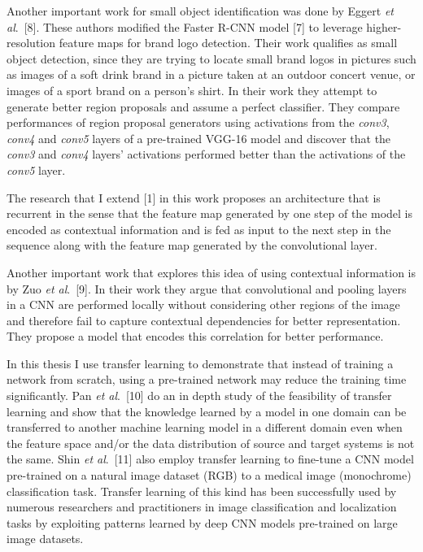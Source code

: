 \documentclass [11pt,letterpaper ,twoside ,openany ]{report}
\begin{document}
    Another important work for small object identification was done by Eggert \textit{et al}.\ [8]. These authors modified the Faster R-CNN model [7] to leverage higher-resolution feature maps for brand logo detection. Their work qualifies as small object detection, since they are trying to locate small brand logos in pictures such as images of a soft drink brand in a picture taken at an outdoor concert venue, or images of a sport brand on a person's shirt. In their work they attempt to generate better region proposals and assume a perfect classifier. They compare performances of region proposal generators using activations from the \textit{conv3}, \textit{conv4} and \textit{conv5} layers of a pre-trained VGG-16 model and discover that the \textit{conv3} and \textit{conv4} layers' activations performed better than the activations of the \textit{conv5} layer. 

    The research that I extend [1] in this work proposes an architecture that is recurrent in the sense that the feature map generated by one step of the model is encoded as contextual information and is fed as input to the next step in the sequence along with the feature map generated by the convolutional layer. 

    Another important work that explores this idea of using contextual information is by Zuo \textit{et al}.\ [9]. In their work they argue that convolutional and pooling layers in a CNN are performed locally without considering other regions of the image and therefore fail to capture contextual dependencies for better representation. They propose a model that encodes this correlation for better performance.

    In this thesis I use transfer learning to demonstrate that instead of training a network from scratch, using a pre-trained network may reduce  the training time significantly. Pan \textit{et al}.\ [10] do an in depth study of the feasibility of transfer learning and show that the knowledge learned by a model in one domain can be transferred to another machine learning model in a different domain even when the feature space and/or the data distribution of source and target systems is not the same. Shin \textit{et al}.\ [11] also employ transfer learning to fine-tune a CNN model pre-trained on a natural image dataset (RGB) to a medical image (monochrome) classification task. Transfer learning of this kind has been successfully used by numerous researchers and practitioners in image classification and localization tasks by exploiting patterns learned by deep CNN models pre-trained on large image datasets. 
\end{document}
